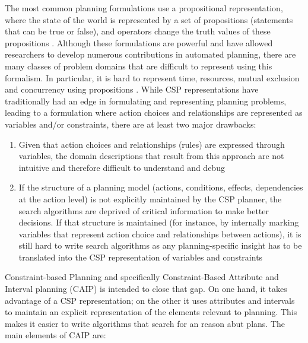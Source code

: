 The most common planning formulations use a propositional
representation, where the state of the world is represented by a set
of propositions (statements that can be true or false), and operators
change the truth values of these propositions \cite{gen87}. Although
these formulations are powerful and have allowed researchers to
develop numerous contributions in automated planning, there are many
classes of problem domains that are difficult to represent using this
formalism. In particular, it is hard to represent time, resources,
mutual exclusion and concurrency using propositions . While CSP representations have traditionally had an edge in
formulating and representing planning problems, 
leading to a formulation where action choices and relationships are
represented as variables and/or constraints, there are at least two
major drawbacks:

\begin{enumerate} 

\item Given that action choices and relationships (rules) are expressed
  through variables, the domain descriptions that result from this
  approach are not intuitive and therefore difficult to understand and
  debug

\item If the structure of a planning model (actions, conditions,
  effects, dependencies at the action level) is not explicitly
  maintained by the CSP planner, the search algorithms are deprived of
  critical information to make better decisions. If that structure is
  maintained (for instance, by internally marking variables that
  represent action choice and relationships between actions), it is
  still hard to write search algorithms as any planning-specific
  insight has to be translated into the CSP representation of
  variables and constraints 

\end{enumerate}

Constraint-based Planning and specifically Constraint-Based Attribute
and Interval planning (CAIP) \cite{mus94,frank2003} is intended to
close that gap. On one hand, it takes advantage of a CSP
representation; on the other it uses attributes and intervals to
maintain an explicit representation of the elements relevant to
planning. This makes it easier to write algorithms that search for an
reason abut plans. The main elements of CAIP are:

